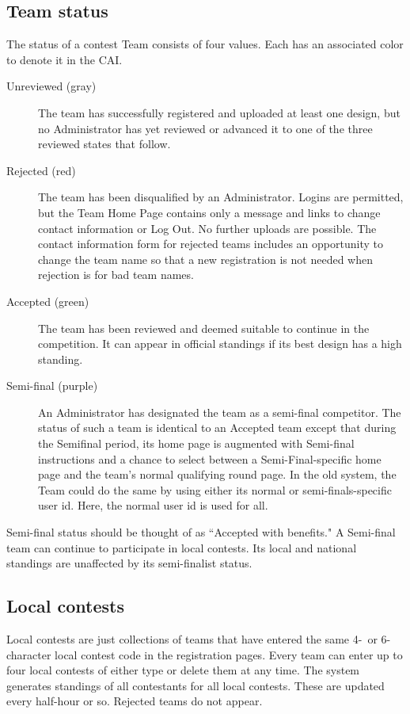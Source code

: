 \documentclass[11pt,letterpaper]{refart}
\begin{document}
\subsection{Team status}
The status of a contest Team consists of four values. Each has an
associated color to denote it in the CAI.
\begin{description}
\item[Unreviewed (gray)] The team has successfully registered and
  uploaded at least one design, but no Administrator has yet reviewed
  or advanced it to one of the three reviewed states that follow.
\item[Rejected (red)] The team has been disqualified by an
  Administrator. Logins are permitted, but the Team Home Page
  contains only a message and links to change contact information
  or Log Out. No further uploads are possible.
  The contact information form for rejected teams includes an
  opportunity to change the team name so that a new
  registration is not needed when rejection is for bad team names.
\item[Accepted (green)] The team has been reviewed and deemed suitable
  to continue in the competition. It can appear in official standings
  if its best design has a high standing.
\item[Semi-final (purple)] An Administrator has designated the team as
  a semi-final competitor. The status of such a team is identical to
  an Accepted team except that during the Semifinal period, its home
  page is augmented with Semi-final instructions and a chance to
  select between a Semi-Final-specific home page and the team's normal
  qualifying round page. In the old system, the Team could do the same
  by using either its normal or semi-finals-specific user id. Here,
  the normal user id is used for all.
\end{description}
Semi-final status should be thought of as ``Accepted with benefits."
A Semi-final team can continue to participate in local contests. Its
local and national standings are unaffected by its semi-finalist
status.

\subsection{Local contests}
Local contests are just collections of teams that have entered the
same 4-\ or 6-character local contest code in the registration
pages. Every team can enter up to four local contests of either type
or delete them at any time. The system generates standings of all
contestants for all local contests. These are updated every half-hour
or so. Rejected teams do not appear.
\end{document}
